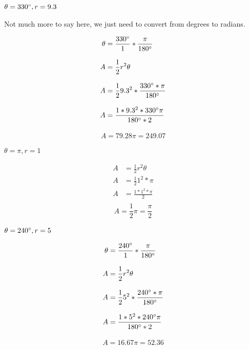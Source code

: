 \documentclass[10pt,letterpaper]{amspset}
\begin{document}
\begin{problem}[59.]
$\theta = 330\degree, r = 9.3$
\end{problem}

\begin{solution}[Solution]
Not much more to say here, we just need to convert from degrees to radians.

\begin{align}
    \theta &=\frac{330\degree}{1} * \frac{\pi}{180\degree} \\[+3mm]
    A &= \frac{1}{2} r^2  \theta \\[+3mm]
    A &= \frac{1}{2} 9.3^2 * \frac{330\degree * \pi}{180\degree} \\[+3mm]
    A &= \frac{1 * 9.3^2 * 330\degree \pi}{180\degree * 2} \\[+3mm]
\end{align}
\[\boxed{A = 79.28 \pi = 249.07}\]
\end{solution}

\pagebreak


\begin{problem}[60.]
$\theta = \pi, r = 1$
\end{problem}

\begin{solution}[Solution]

\begin{align}
    A &= \frac{1}{2} r^2  \theta \\[+3mm]
    A &= \frac{1}{2} 1^2 * \pi \\[+3mm]
    A &= \frac{1 * 1^2 * \pi}{2} \\[+3mm]
\end{align}
\[\boxed{A = \frac{1}{2}\pi = \frac{\pi}{2}}\]
\end{solution}


\begin{problem}[61.]
$\theta = 240\degree, r = 5$
\end{problem}

\begin{solution}[Solution]

\begin{align}
    \theta &=\frac{240\degree}{1} * \frac{\pi}{180\degree} \\[+3mm]
    A &= \frac{1}{2} r^2  \theta \\[+3mm]
    A &= \frac{1}{2} 5^2 * \frac{240\degree * \pi}{180\degree} \\[+3mm]
    A &= \frac{1 * 5^2 * 240\degree \pi}{180\degree * 2} \\[+3mm]
\end{align}
\[\boxed{A = 16.67 \pi = 52.36}\]
\end{solution}
\end{document}
